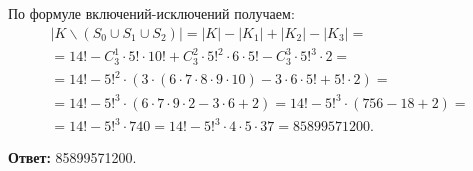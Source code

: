 \begin{solution}
\begin{enumerate}
    По формуле включений-исключений получаем:
    \begin{multline*}
        |K \backslash (S_0 \cup S_1 \cup S_2)| = |K| - |K_1| + |K_2| - |K_3| = \\
        = 14! - C_3^1 \cdot 5! \cdot 10! + C_3^2 \cdot 5!^2 \cdot 6 \cdot 5! - C_3^3 \cdot 5!^3 \cdot 2 = \\
        = 14! - 5!^2 \cdot \left( 3 \cdot \left( 6 \cdot 7 \cdot 8 \cdot 9 \cdot 10 \right) - 3 \cdot 6 \cdot 5! + 5! \cdot 2 \right) = \\
        = 14! - 5!^3 \cdot (6 \cdot 7 \cdot 9 \cdot 2 - 3 \cdot 6 + 2) = 14! - 5!^3 \cdot \left( 756 - 18 + 2 \right) = \\
        = 14! - 5!^3 \cdot 740 = 14! - 5!^3 \cdot 4 \cdot 5 \cdot 37 = 85899571200.
    \end{multline*}
\end{enumerate}

\textbf{Ответ:} 85899571200.

\end{solution}
